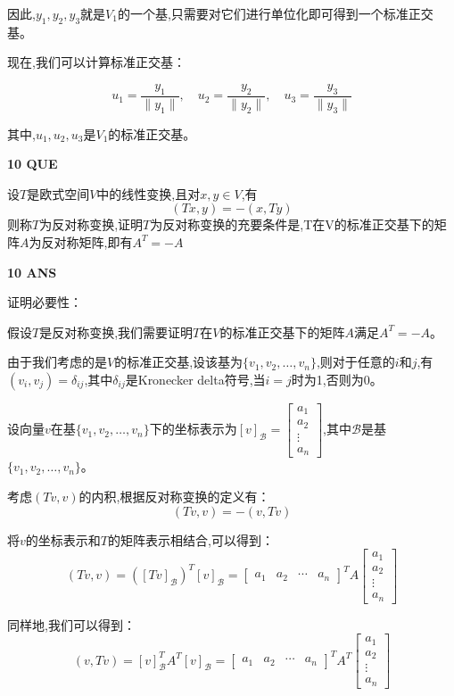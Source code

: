 \documentclass[11pt,letterpaper]{ctexart}
\begin{document}
\begin{enumerate}
因此,$y_1, y_2, y_3$就是$V_1$的一个基,只需要对它们进行单位化即可得到一个标准正交基。


现在,我们可以计算标准正交基：

\[
u_1 = \frac{y_1}{\|y_1\|}, \quad u_2 = \frac{y_2}{\|y_2\|}, \quad u_3 = \frac{y_3}{\|y_3\|}
\]

其中,$u_1, u_2, u_3$是$V_1$的标准正交基。

\textbf{10 QUE}
\bigskip

设$T$是欧式空间$V$中的线性变换,且对$x, y \in V$,有
\[ (Tx, y) = -(x, Ty)\]
则称$T$为反对称变换,证明$T$为反对称变换的充要条件是,T在V的标准正交基下的矩阵$A$为反对称矩阵,即有$A^T = -A$

\textbf{10 ANS}
\bigskip


证明必要性：

假设$T$是反对称变换,我们需要证明$T$在$V$的标准正交基下的矩阵$A$满足$A^T = -A$。

由于我们考虑的是$V$的标准正交基,设该基为$\{v_1, v_2, \ldots, v_n\}$,则对于任意的$i$和$j$,有$(v_i, v_j) = \delta_{ij}$,其中$\delta_{ij}$是Kronecker delta符号,当$i=j$时为1,否则为0。

设向量$v$在基$\{v_1, v_2, \ldots, v_n\}$下的坐标表示为$[v]_\mathcal{B} = \begin{bmatrix} a_1 \\ a_2 \\ \vdots \\ a_n \end{bmatrix}$,其中$\mathcal{B}$是基$\{v_1, v_2, \ldots, v_n\}$。

考虑$(Tv, v)$的内积,根据反对称变换的定义有：
\[(Tv, v) = -(v, Tv)\]

将$v$的坐标表示和$T$的矩阵表示相结合,可以得到：
\[(Tv, v) = ([Tv]_\mathcal{B})^T [v]_\mathcal{B} = \begin{bmatrix} a_1 & a_2 & \cdots & a_n \end{bmatrix}^T A \begin{bmatrix} a_1 \\ a_2 \\ \vdots \\ a_n \end{bmatrix}\]

同样地,我们可以得到：
\[(v, Tv) = [v]_\mathcal{B}^T A^T [v]_\mathcal{B} = \begin{bmatrix} a_1 & a_2 & \cdots & a_n \end{bmatrix}^T A^T \begin{bmatrix} a_1 \\ a_2 \\ \vdots \\ a_n \end{bmatrix}\]


\end{enumerate}
\end{document}
